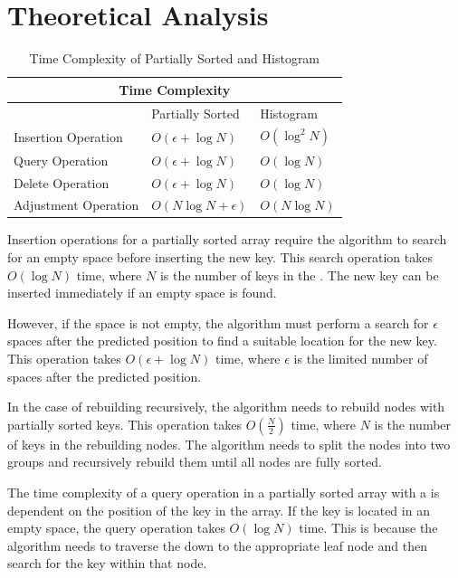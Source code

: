 \section{Theoretical Analysis}\label{partialsortedtheory}
\begin{table}
    \centering
    \begin{tabular}{ |p{4cm}|p{3cm}|p{3cm}|  } 
        
     \hline
     \multicolumn{3}{|c|}{Time Complexity} \\
     \hline
      & Partially Sorted & Histogram \\
     \hline
      Insertion Operation & $O(\epsilon + \log N)$ & $O(\log^2 N)$ \\
     \hline
      Query Operation &  $O(\epsilon + \log N)$ & $O(\log N)$ \\
      \hline
      Delete Operation &  $O(\epsilon + \log N)$ & $O(\log N)$ \\
      \hline
      Adjustment Operation & $O(N\log N + \epsilon)$ &  $O(N\log N)$ \\
      \hline
    \end{tabular}
     \caption{Time Complexity of Partially Sorted and Histogram\learnindex}
    \label{tab:timecomplexitypartiallysorted}
\end{table}

Insertion operations for a partially sorted array require the algorithm to search for an empty space before inserting the new key. This search operation takes $O(\log N)$ time, where $N$ is the number of keys in the \learnindex. The new key can be inserted immediately if an empty space is found.

However, if the space is not empty, the algorithm must perform a search for $\epsilon$ spaces after the predicted position to find a suitable location for the new key. This operation takes $O(\epsilon + \log N)$ time, where $\epsilon$ is the limited number of spaces after the predicted position.

In the case of rebuilding recursively, the algorithm needs to rebuild nodes with partially sorted keys. This operation takes $O(\frac{N}{2})$ time, where $N$ is the number of keys in the rebuilding nodes. The algorithm needs to split the nodes into two groups and recursively rebuild them until all nodes are fully sorted.

The time complexity of a query operation in a partially sorted array with a \learnindex is dependent on the position of the key in the array. If the key is located in an empty space, the query operation takes $O(\log N)$ time. This is because the algorithm needs to traverse the \learnindex down to the appropriate leaf node and then search for the key within that node.

